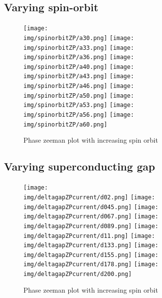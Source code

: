 \documentclass[10pt,a4paper]{article}
\newcommand{\img}{./images}
\begin{document}
	\subsection{Varying spin-orbit}
		\begin{figure}[H]
			\texttt{[image: \\img/spinorbitZP/a30.png]}
			\texttt{[image: \\img/spinorbitZP/a33.png]}
			\texttt{[image: \\img/spinorbitZP/a36.png]}
			\texttt{[image: \\img/spinorbitZP/a40.png]}
			\texttt{[image: \\img/spinorbitZP/a43.png]}
			\texttt{[image: \\img/spinorbitZP/a46.png]}
			\texttt{[image: \\img/spinorbitZP/a50.png]}
			\texttt{[image: \\img/spinorbitZP/a53.png]}
			\texttt{[image: \\img/spinorbitZP/a56.png]}
			\texttt{[image: \\img/spinorbitZP/a60.png]}
			\caption{Phase zeeman plot with increasing spin orbit}
		\end{figure}
	\subsection{Varying superconducting gap}
		\begin{figure}[H]
			\texttt{[image: \\img/deltagapZPcurrent/d02.png]}
			\texttt{[image: \\img/deltagapZPcurrent/d045.png]}
			\texttt{[image: \\img/deltagapZPcurrent/d067.png]}
			\texttt{[image: \\img/deltagapZPcurrent/d089.png]}
			\texttt{[image: \\img/deltagapZPcurrent/d11.png]}
			\texttt{[image: \\img/deltagapZPcurrent/d133.png]}
			\texttt{[image: \\img/deltagapZPcurrent/d155.png]}
			\texttt{[image: \\img/deltagapZPcurrent/d178.png]}
			\texttt{[image: \\img/deltagapZPcurrent/d200.png]}
			\caption{Phase zeeman plot with increasing spin orbit}
		\end{figure}
\end{document}
